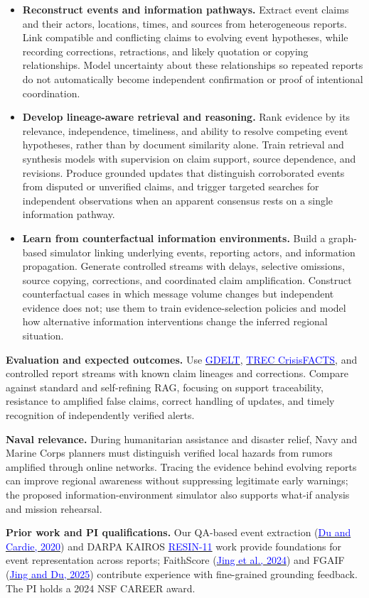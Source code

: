 \documentclass[11pt,letterpaper]{article}
\newcommand{\head}[1]{\textbf{#1}\enspace}
\begin{document}
\begin{itemize}
\item \textbf{Reconstruct events and information pathways.} Extract event claims and their actors, locations, times, and sources from heterogeneous reports. Link compatible and conflicting claims to evolving event hypotheses, while recording corrections, retractions, and likely quotation or copying relationships. Model uncertainty about these relationships so repeated reports do not automatically become independent confirmation or proof of intentional coordination.
\item \textbf{Develop lineage-aware retrieval and reasoning.} Rank evidence by its relevance, independence, timeliness, and ability to resolve competing event hypotheses, rather than by document similarity alone. Train retrieval and synthesis models with supervision on claim support, source dependence, and revisions. Produce grounded updates that distinguish corroborated events from disputed or unverified claims, and trigger targeted searches for independent observations when an apparent consensus rests on a single information pathway.
\item \textbf{Learn from counterfactual information environments.} Build a graph-based simulator linking underlying events, reporting actors, and information propagation. Generate controlled streams with delays, selective omissions, source copying, corrections, and coordinated claim amplification. Construct counterfactual cases in which message volume changes but independent evidence does not; use them to train evidence-selection policies and model how alternative information interventions change the inferred regional situation.
\end{itemize}
\head{Evaluation and expected outcomes.} Use \href{https://www.gdeltproject.org/}{\textcolor{blue}{GDELT}}, \href{https://trec.nist.gov/data/crisis.html}{\textcolor{blue}{TREC CrisisFACTS}}, and controlled report streams with known claim lineages and corrections. Compare against standard and self-refining RAG, focusing on support traceability, resistance to amplified false claims, correct handling of updates, and timely recognition of independently verified alerts.
\par\head{Naval relevance.} During humanitarian assistance and disaster relief, Navy and Marine Corps planners must distinguish verified local hazards from rumors amplified through online networks. Tracing the evidence behind evolving reports can improve regional awareness without suppressing legitimate early warnings; the proposed information-environment simulator also supports what-if analysis and mission rehearsal.
\par\head{Prior work and PI qualifications.} Our QA-based event extraction (\href{https://doi.org/10.18653/v1/2020.emnlp-main.49}{\textcolor{blue}{Du and Cardie, 2020}}) and DARPA KAIROS \href{https://doi.org/10.18653/v1/2022.naacl-demo.7}{\textcolor{blue}{RESIN-11}} work provide foundations for event representation across reports; FaithScore (\href{https://aclanthology.org/2024.findings-emnlp.290/}{\textcolor{blue}{Jing et al., 2024}}) and FGAIF (\href{https://openreview.net/forum?id=Qhfw5CUVd7}{\textcolor{blue}{Jing and Du, 2025}}) contribute experience with fine-grained grounding feedback. The PI holds a 2024 NSF CAREER award.
\end{document}
